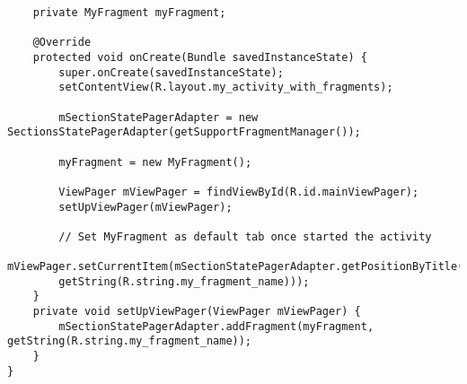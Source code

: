 \documentclass[11pt]{article}
\begin{document}
\begin{enumerate}
\begin{lstlisting}
    private MyFragment myFragment;
    
    @Override
    protected void onCreate(Bundle savedInstanceState) {
        super.onCreate(savedInstanceState);
        setContentView(R.layout.my_activity_with_fragments);
        
        mSectionStatePagerAdapter = new SectionsStatePagerAdapter(getSupportFragmentManager());
        
        myFragment = new MyFragment();
        
        ViewPager mViewPager = findViewById(R.id.mainViewPager);
        setUpViewPager(mViewPager);
        
        // Set MyFragment as default tab once started the activity
        mViewPager.setCurrentItem(mSectionStatePagerAdapter.getPositionByTitle(
        getString(R.string.my_fragment_name)));
    }
    private void setUpViewPager(ViewPager mViewPager) {
        mSectionStatePagerAdapter.addFragment(myFragment, getString(R.string.my_fragment_name));
    }
}
    \end{lstlisting}
\end{enumerate}
\end{document}
